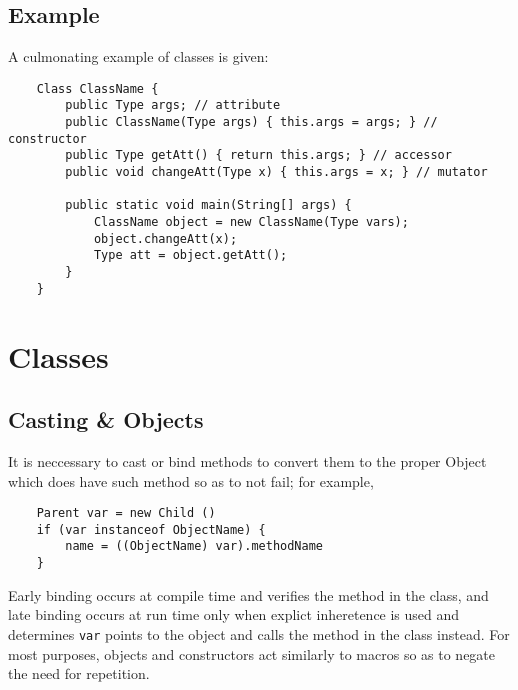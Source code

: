 \documentclass[letterpaper, openany, justified]{tufte-book}
\newcommand{\cd}[1]{\lstinline{#1}}
\begin{document}
\begin{fullwidth}
\section{Example}
A culmonating example of classes is given:
\begin{lstlisting}
    Class ClassName {
        public Type args; // attribute
        public ClassName(Type args) { this.args = args; } // constructor
        public Type getAtt() { return this.args; } // accessor
        public void changeAtt(Type x) { this.args = x; } // mutator

        public static void main(String[] args) {
            ClassName object = new ClassName(Type vars);
            object.changeAtt(x);
            Type att = object.getAtt();
        }
    }
\end{lstlisting}

\chapter{Classes}

\section{Casting \& Objects}
It is neccessary to cast or bind methods to convert them to the proper Object which does have such method so as to not fail; for example,
\begin{lstlisting}
    Parent var = new Child ()
    if (var instanceof ObjectName) {
        name = ((ObjectName) var).methodName
    }
\end{lstlisting}
Early binding occurs at compile time and verifies the method in the class, and late binding occurs at run time only when explict inheretence is used and determines \cd{var} points to the object and calls the method in the class instead. For most purposes, objects and constructors act similarly to macros so as to negate the need for repetition.


\end{fullwidth}
\end{document}
